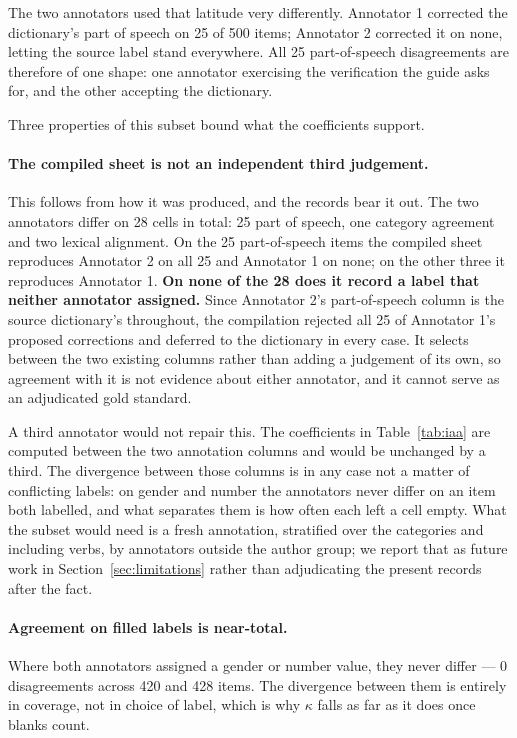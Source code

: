 \documentclass[11pt]{article}
\begin{document}
The two annotators used that latitude very differently. Annotator 1 corrected
the dictionary's part of speech on 25 of 500 items; Annotator 2 corrected it
on none, letting the source label stand everywhere. All 25 part-of-speech
disagreements are therefore of one shape: one annotator exercising the
verification the guide asks for, and the other accepting the dictionary.

Three properties of this subset bound what the coefficients support.

\paragraph{The compiled sheet is not an independent third judgement.} This
follows from how it was produced, and the records bear it out. The two
annotators differ on 28 cells in total: 25 part of speech, one category
agreement and two lexical alignment. On the 25 part-of-speech items the
compiled sheet reproduces Annotator 2 on all 25 and Annotator 1 on none; on
the other three it reproduces Annotator 1. \textbf{On none of the 28 does it
record a label that neither annotator assigned.} Since Annotator 2's
part-of-speech column is the source dictionary's throughout, the compilation
rejected all 25 of Annotator 1's proposed corrections and deferred to the
dictionary in every case. It selects between the two
existing columns rather than adding a judgement of its own, so agreement with
it is not evidence about either annotator, and it cannot serve as an
adjudicated gold standard.

A third annotator would not repair this. The coefficients in
Table~\ref{tab:iaa} are computed between the two annotation columns and would
be unchanged by a third. The divergence between those columns is in any case
not a matter of conflicting labels: on gender and number the annotators never
differ on an item both labelled, and what separates them is how often each
left a cell empty. What the subset would need is a fresh annotation,
stratified over the categories and including verbs, by annotators outside the
author group; we report that as future work in
Section~\ref{sec:limitations} rather than adjudicating the present records
after the fact.

\paragraph{Agreement on filled labels is near-total.} Where both annotators
assigned a gender or number value, they never differ --- 0 disagreements
across 420 and 428 items. The divergence between them is entirely in coverage,
not in choice of label, which is why $\kappa$ falls as far as it does once
blanks count.
\end{document}
